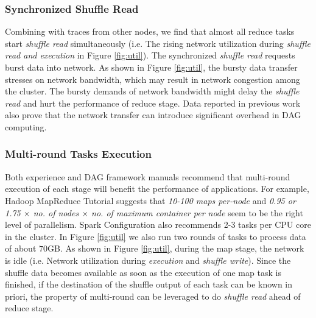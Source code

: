 \subsubsection{Synchronized Shuffle Read}
Combining with traces from other nodes, we find that almost all reduce tasks start \textit{shuffle read} simultaneously (i.e. The rising network utilization during \textit{shuffle read and execution} in Figure \ref{fig:util}). The synchronized \textit{shuffle read} requests burst data into network. As shown in Figure \ref{fig:util}, the bursty data transfer stresses on network bandwidth, which may result in network congestion among the cluster. The  bursty demands of network bandwidth might delay the \textit{shuffle read} and hurt the performance of reduce stage. Data reported in previous work\cite{coflow, managing} also prove that the network transfer can introduce significant overhead in DAG computing.

\subsubsection{Multi-round Tasks Execution}\label{multi}
Both experience and DAG framework manuals recommend that multi-round execution of each stage will benefit the performance of applications.
For example, Hadoop MapReduce Tutorial \cite{hadooptutorial} suggests that \textit{10-100 maps per-node} and \textit{0.95 or 1.75 $\times$ no. of nodes $\times$ no. of maximum container per node} seem to be the right level of parallelism. Spark Configuration also recommends 2-3 tasks per CPU core in the cluster\cite{sparkconf}.
In Figure \ref{fig:util} we also run two rounds of tasks to process data of about $70$GB. As shown in Figure \ref{fig:util}, during the map stage, the network is idle (i.e. Network utilization during \textit{execution} and \textit{shuffle write}). Since the shuffle data becomes available as soon as the execution of one map task is finished, if the destination of the shuffle output of each task can be known in priori, the property of multi-round can be leveraged to do \textit{shuffle read} ahead of reduce stage.



